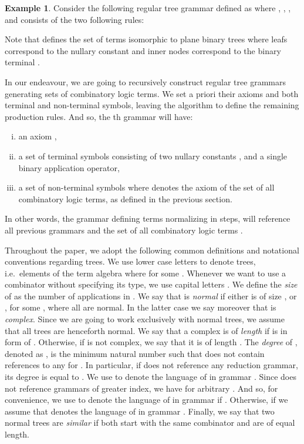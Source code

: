 \documentclass[11pt,a4paper]{amsart}
\theoremstyle{definition}
\newtheorem{example}[theorem]{Example}
\begin{document}
\begin{example} 
Consider the following regular tree grammar defined as  where
, , , and  consists of the two following rules: 

Note that  defines the set of terms isomorphic to plane binary trees where
leafs correspond to the nullary constant  and inner nodes correspond to
the binary terminal .
\end{example}

In our endeavour, we are going to recursively construct regular tree grammars
generating sets of combinatory logic terms. We set a priori their axioms and
both terminal and non-terminal symbols, leaving the algorithm to define the
remaining production rules. And so, the th grammar  will have:
\begin{enumerate}[(i)]
    \item an axiom ,
    \item a set  of terminal symbols consisting of two nullary
            constants ,  and a single binary application operator,
    \item a set of non-terminal symbols  where  denotes the axiom of the set
            of all combinatory logic terms, as defined in the previous section.
\end{enumerate}
In other words, the grammar  defining terms normalizing in  steps, will
reference all previous grammars  and the set of all
combinatory logic terms . 

Throughout the paper, we adopt the following common definitions and notational
conventions regarding trees. We use lower case letters
 to denote trees, i.e.~elements of the term
algebra  where 
for some . Whenever we want to use a combinator without specifying its type,
we use capital letters . We define the \emph{size} of  as
the number of applications in .  We say that  is \emph{normal}
if either  is of size , or , for
some , where all  are normal. In the latter
case we say moreover that  is \emph{complex}. Since we are going to work exclusively with normal trees, we assume that all trees are henceforth normal.
We say that a complex  is of \emph{length}  if  is in form of . Otherwise, if  is not complex, we say that it is of length . The \emph{degree} of , denoted as , is the minimum natural number  such that  does not contain references to any  for . In particular, if  does not reference any reduction grammar, its degree is equal to . We use  to denote the language of  in grammar . Since  does not reference grammars of greater index, we have
 for arbitrary .
And so, for convenience, we use  to denote the language of  in grammar  if . Otherwise, if 
 we assume that  denotes the language of  in grammar . Finally, we say that two normal trees are
\emph{similar} if both start with the same combinator  and are of equal
length.
\end{document}
